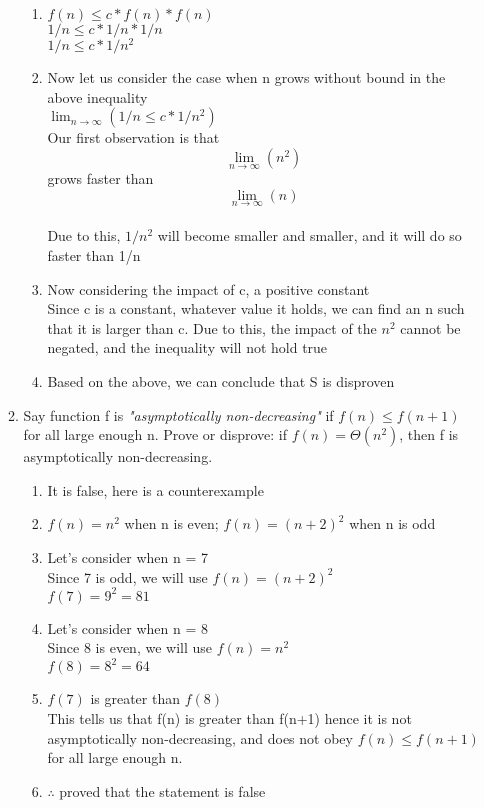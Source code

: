 \documentclass[11pt]{article}
\begin{document}
\begin{enumerate}
\begin{enumerate}
\begin{enumerate}
            \item $f(n) \leq c * f(n) * f(n)$\\
            $1/n \leq c * 1/n * 1/n$\\
            $1/n \leq c * 1/n^2$\\
            
            \item Now let us consider the case when n grows without bound in the above inequality\\
             $\lim_{n\to\infty} (1/n \leq c * 1/n^2)$ \\
             Our first observation is that \[ \lim_{n\to\infty} (n^2) \] grows faster than \[ \lim_{n\to\infty} (n) \]\\
             Due to this, $1/n^2$ will become smaller and smaller, and it will do so faster than 1/n
             
            \item Now considering the impact of c, a positive constant \\
            Since c is a constant, whatever value it holds, we can find an n such that it is larger than c. Due to this, the impact of the $n^2$ cannot be negated, and the inequality will not hold true
            \item Based on the above, we can conclude that S is disproven
        \end{enumerate}

        \item Say function f is \textit{"asymptotically non-decreasing"} if $f(n)≤f(n+1)$ for all large enough n. Prove or disprove: if $f(n)=Θ(n^2)$, then f is asymptotically non-decreasing.
        
        \begin{enumerate}
            \item  It is false, here is a counterexample
            \item $f(n) = n^2$ when n is even; $f(n) = (n+2)^2$ when n is odd
            \item Let's consider when n = 7\\
            Since 7 is odd, we will use $f(n) = (n+2)^2$\\
            $f(7) = 9^2 = 81$
            \item Let's consider when n = 8\\
            Since 8 is even, we will use $f(n) = n^2$\\
            $f(8) = 8^2 = 64$
            \item $f(7)$ is greater than $f(8)$\\
            This tells us that f(n) is greater than f(n+1) hence it is not asymptotically non-decreasing, and does not obey $f(n)≤f(n+1)$ for all large enough n. 
            \item $\therefore$ proved that the statement is false
        \end{enumerate}
        

\end{enumerate}
\end{enumerate}
\end{document}
